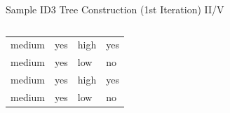 \documentclass[document.tex]{subfiles}
\begin{document}
\begin{frame}{Sample ID3 Tree Construction (1st Iteration) II/V}
\begin{columns}
\begin{column}{0.4\textwidth}
\begin{table}
{\begin{tabular}{llll}
                            \rowcolor{LightGreen}
                            medium &   yes &        high &    yes \\
                            \rowcolor{LightRed}
                            medium &   yes &         low &     no \\
                            \rowcolor{LightGreen}
                            medium &   yes &        high &    yes \\
                            \rowcolor{LightRed}
                            medium &   yes &         low &     no \\
                            \bottomrule
                        \end{tabular}
                    }
                \end{table}
                \vspace*{-6mm}
                \begin{table}
                    \caption*{\footnotesize Attribute $A=VIBRATION$, Sample $S_H$ \normalsize}
                    \vspace*{-2mm}	
                \end{table}
            \end{column}
            \begin{column}{0.6\textwidth}
                \begin{alignat*}{3}

\end{alignat*}
\end{column}
\end{columns}
\end{frame}
\end{document}
